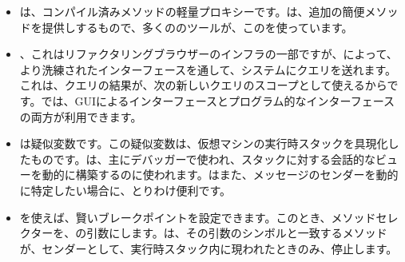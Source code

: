 \documentclass[a4paper,10pt,twoside]{book}
\begin{document}
\begin{itemize}
\item {}は、コンパイル済みメソッドの軽量プロキシーです。は、追加の簡便メソッドを提供しするもので、多くの\st{}のツールが、このを使っています。
\item {}、これはリファクタリングブラウザーのインフラの一部ですが、によって、より洗練されたインターフェースを通して、システムにクエリを送れます。これは、クエリの結果が、次の新しいクエリのスコープとして使えるからです。では、GUIによるインターフェースとプログラム的なインターフェースの両方が利用できます。%
\item {}は疑似変数です。この疑似変数は、仮想マシンの実行時スタックを具現化したものです。は、主にデバッガーで使われ、スタックに対する会話的なビューを動的に構築するのに使われます。はまた、メッセージのセンダーを動的に特定したい場合に、とりわけ便利です。%
\item {}を使えば、賢いブレークポイントを設定できます。このとき、メソッドセレクターを、の引数にします。は、その引数のシンボルと一致するメソッドが、センダーとして、実行時スタック内に現われたときのみ、停止します。

\end{itemize}
\end{document}
